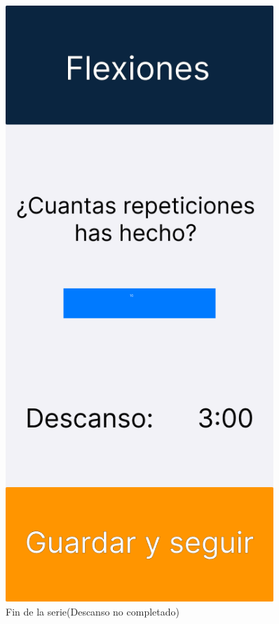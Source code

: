 \begin{figure}[H]
\begin{minipage}{0.45\textwidth}
      \label{fig:Realizando flexiones}
   \end{minipage}%
   \hspace{0.25cm}
   \begin{minipage}{0.45\textwidth}
      \centering
      \includegraphics[width=0.9\textwidth]{fotos/Frame 4.png}
      \caption{Fin de la serie(Descanso no completado)}
      \label{fig:Fin de la serie(Descanso no completado)}
   \end{minipage}
\end{figure}

